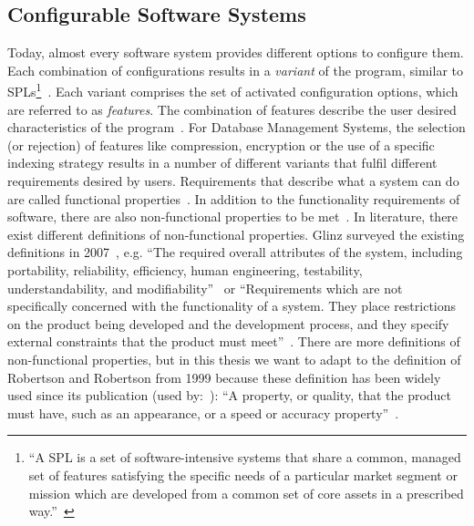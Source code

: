 \subsection{Configurable Software Systems}
\label{background_conf_sys}
Today, almost every software system provides different options to configure them. 
Each combination of configurations results in a \textit{variant} of the program, similar to \acp{SPL}\footnote{``A \ac{SPL} is a set of software-intensive systems that share a common, managed set of features satisfying the specific needs of a particular market segment or mission which are developed from a common set of core assets in a prescribed way.''~\cite{northrop2010spl}}~\cite{siegmund2012spl}. 
Each variant comprises the set of activated configuration options, which are referred to as \textit{features}. 
The combination of features describe the user desired characteristics of the program~\cite{czarnecki2000generative}.
For Database Management Systems, the selection (or rejection) of features like compression, encryption or the use of a specific indexing strategy results in a number of different variants that fulfil different requirements desired by users. 
Requirements that describe what a system can do are called functional properties~\cite{siegmund2012spl,guo2013variability}. 
In addition to the functionality requirements of software, there are also non-functional properties to be met~\cite{siegmund2012spl,guo2013variability,sarkar2015cost,siegmund2015performance}.
In literature, there exist different definitions of non-functional properties. 
Glinz surveyed the existing definitions in 2007~\cite{glinz2007non}, e.g. ``The required overall attributes of the system, including portability, reliability, efficiency, human engineering, testability, understandability, and modifiability''~\cite{davis1993software} or ``Requirements which are not specifically concerned with the functionality of a system. 
They place restrictions on the product being developed and the development process, and they specify external constraints that the product must meet''~\cite{kotonya1998requirements}. 
There are more definitions of non-functional properties, but in this thesis we want to adapt to the definition of Robertson and Robertson from 1999 because these definition has been widely used since its publication (used by:~\cite{nuseibeh2000requirements,jackson2001problem,cohn2004user,siegmund2012spl}): ``A property, or quality, that the product must have, such as an appearance, or a speed or accuracy property''~\cite{robertson1999mastering}.

